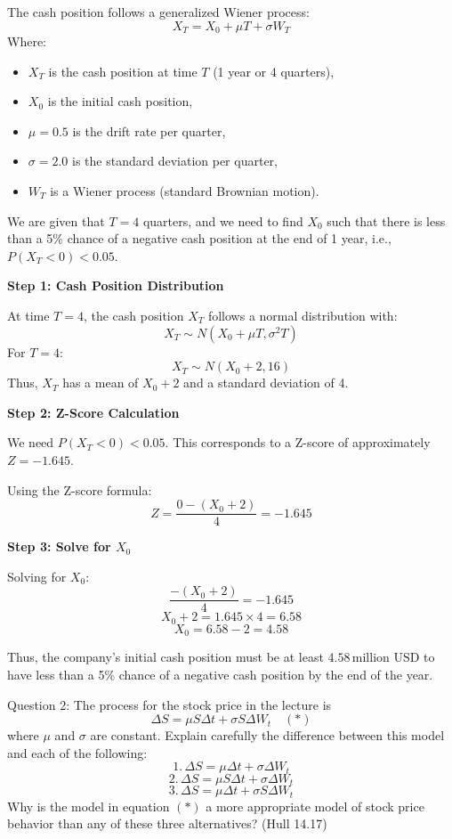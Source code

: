 \documentclass[12pt,letterpaper,onecolumn]{exam}
\begin{document}
\begin{solution}
The cash position follows a generalized Wiener process:
\[
X_T = X_0 + \mu T + \sigma W_T
\]
Where:
\begin{itemize}
    \item \( X_T \) is the cash position at time \( T \) (1 year or 4 quarters),
    \item \( X_0 \) is the initial cash position,
    \item \( \mu = 0.5 \) is the drift rate per quarter,
    \item \( \sigma = 2.0 \) is the standard deviation per quarter,
    \item \( W_T \) is a Wiener process (standard Brownian motion).
\end{itemize}

We are given that \( T = 4 \) quarters, and we need to find \( X_0 \) such that there is less than a 5\% chance of a negative cash position at the end of 1 year, i.e., \( P(X_T < 0) < 0.05 \).

\textbf{Step 1: Cash Position Distribution}

At time \( T = 4 \), the cash position \( X_T \) follows a normal distribution with:
\[
X_T \sim N(X_0 + \mu T, \sigma^2 T)
\]
For \( T = 4 \):
\[
X_T \sim N(X_0 + 2, 16)
\]
Thus, \( X_T \) has a mean of \( X_0 + 2 \) and a standard deviation of 4.

\textbf{Step 2: Z-Score Calculation}

We need \( P(X_T < 0) < 0.05 \). This corresponds to a Z-score of approximately \( Z = -1.645 \).

Using the Z-score formula:
\[
Z = \frac{0 - (X_0 + 2)}{4} = -1.645
\]

\textbf{Step 3: Solve for \( X_0 \)}

Solving for \( X_0 \):
\[
\frac{-(X_0 + 2)}{4} = -1.645
\]
\[
X_0 + 2 = 1.645 \times 4 = 6.58
\]
\[
X_0 = 6.58 - 2 = 4.58
\]

Thus, the company’s initial cash position must be at least \( \boxed{4.58} \, \text{million USD} \) to have less than a 5\% chance of a negative cash position by the end of the year.

\end{solution}

\newpage


\begin{question}{Question 2:}
The process for the stock price in the lecture is
\[
\Delta S = \mu S \Delta t + \sigma S \Delta W_t \quad (\ast)
\]
where \( \mu \) and \( \sigma \) are constant. Explain carefully the difference between this model and each of the following:
\[
1. \, \Delta S = \mu \Delta t + \sigma \Delta W_t
\]
\[
2. \, \Delta S = \mu S \Delta t + \sigma \Delta W_t
\]
\[
3. \, \Delta S = \mu \Delta t + \sigma S \Delta W_t
\]
Why is the model in equation \( (\ast) \) a more appropriate model of stock price behavior than any of these three alternatives? (Hull 14.17)
\end{question}
\end{document}
